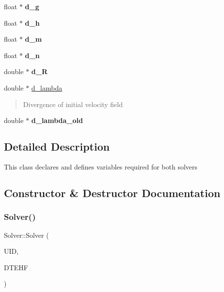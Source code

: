 \begin{DoxyCompactItemize}
float $\ast$ {\bfseries d\+\_\+g}
\item 
\mbox{\label{classSolver_ae708f693b743b5939f88a9624063d39b}} 
float $\ast$ {\bfseries d\+\_\+h}
\item 
\mbox{\label{classSolver_ab3729adae1ab25ee5fe1265100ea7225}} 
float $\ast$ {\bfseries d\+\_\+m}
\item 
\mbox{\label{classSolver_add6e093a1b6b6b8c00b934415dc7074b}} 
float $\ast$ {\bfseries d\+\_\+n}
\item 
\mbox{\label{classSolver_ac9743d00efa4366b6a1c6a5b2f0538bf}} 
double $\ast$ {\bfseries d\+\_\+R}
\item 
\mbox{\label{classSolver_a30c2fca173a23bd9808246601720d01e}} 
double $\ast$ \hyperlink{classSolver_a30c2fca173a23bd9808246601720d01e}{d\+\_\+lambda}
\begin{DoxyCompactList}\small\item\em \begin{quote}
Divergence of initial velocity field \end{quote}
\end{DoxyCompactList}\item 
\mbox{\label{classSolver_a91977bd785a8bf99c5cf19f108c6b146}} 
double $\ast$ {\bfseries d\+\_\+lambda\+\_\+old}
\end{DoxyCompactItemize}


\subsection{Detailed Description}
This class declares and defines variables required for both solvers 

\subsection{Constructor \& Destructor Documentation}
\mbox{\label{classSolver_a0df0752d39f016c7dc636d8c46274218}} 
\subsubsection{\texorpdfstring{Solver()}{Solver()}}
{\footnotesize\ttfamily Solver\+::\+Solver (\begin{DoxyParamCaption}\item[{\hyperlink{classURBInputData}{U\+R\+B\+Input\+Data} $\ast$}]{U\+ID,  }\item[{\hyperlink{classDTEHeightField}{D\+T\+E\+Height\+Field} $\ast$}]{D\+T\+E\+HF }\end{DoxyParamCaption})}

